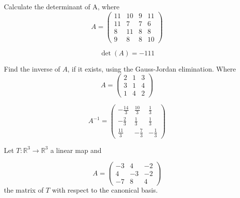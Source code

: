 \begin{questions}

\question Calculate the determinant of A, where
$$
A=\left(\begin{array}{rrrr}
11 & 10 & 9 & 11 \\
11 & 7 & 7 & 6 \\
8 & 11 & 8 & 8 \\
9 & 8 & 8 & 10
\end{array}\right)
$$

\begin{solution}
$$\det(A)=-111$$
\end{solution}

\question Find the inverse of $A$, if it exists, using the Gauss-Jordan elimination. Where
$$
A=\left(\begin{array}{rrr}
2 & 1 & 3 \\
3 & 1 & 4 \\
1 & 4 & 2
\end{array}\right)
$$

\begin{solution}
$$A^{-1}=\left(\begin{array}{rrr}
-\frac{14}{3} & \frac{10}{3} & \frac{1}{3} \\
-\frac{2}{3} & \frac{1}{3} & \frac{1}{3} \\
\frac{11}{3} & -\frac{7}{3} & -\frac{1}{3}
\end{array}\right)$$
\end{solution}

\question Let $T:\mathbb{R}^3\rightarrow\mathbb{R}^3$  a linear map and
 
$$
A=\left(\begin{array}{rrr}
-3 & 4 & -2 \\
4 & -3 & -2 \\
-7 & 8 & 4
\end{array}\right)
$$
the matrix of $T$ with respect to the canonical basis.
\end{questions}
